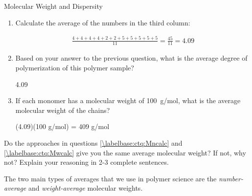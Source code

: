 \begin{activity}{Molecular Weight and Dispersity}
\begin{ctqs}
\begin{enumerate}
			\item Calculate the average of the numbers in the third column:
			
				\begin{solution}[1.5in]
				
					\begin{align*}
						\frac{4+4+4+4+2+2+5+5+5+5+5}{11} = \frac{45}{11} = 4.09
					\end{align*}
				
				\end{solution}
			
			\item Based on your answer to the previous question, what is the average degree of polymerization of this polymer sample?
			
				\begin{solution}[0.75in]
					4.09
				\end{solution}
				
			\item If each monomer has a molecular weight of 100~g/mol, what is the average molecular weight of the chains?
			
				\begin{solution}[0.75in]
					(4.09)(100 g/mol) = 409 g/mol
				\end{solution}
				
		\end{enumerate}
		
	\question Do the approaches in questions \ref{\labelbase:ctq:Mncalc} and \ref{\labelbase:ctq:Mwcalc} give you the same average molecular weight?  If not, why not?  Explain your reasoning in 2-3 complete sentences.
	
		\begin{solution}[3in]\end{solution}
		
\end{ctqs}

\begin{infobox}
\label{\labelbase:infobox:MnMw}
	
	The two main types of averages that we use in polymer science are the \emph{number-average} and \emph{weight-average} molecular weights.
	

\end{infobox}
\end{activity}
